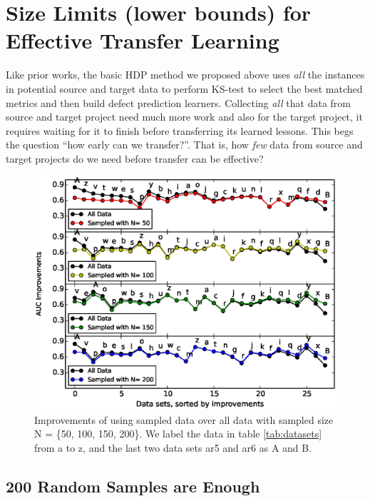 
\section{Size Limits (lower bounds) for Effective Transfer Learning}
\label{sec:sizelimit}

Like prior works\cite{nam2013transfer,
  ma2012transfer, rahman2012recalling, ryu2014value,
  zhang2014towards}, the basic HDP method we
proposed above uses {\em all} the instances in potential source and target data to
perform KS-test to select the best matched metrics and then build
defect prediction learners.
Collecting {\em all} that data from source and target project need much more work and also
for the target project, it requires waiting for it to finish before
transferring its learned lessons. This begs the question ``how early can we transfer?''.
That is, how {\em few} data from source and target projects do we need before transfer can be effective?

\begin{figure}[!htp]
	\centering
	\includegraphics[width=\linewidth]{Figures/raleigh/sample_random.eps}
	\caption{Improvements of using sampled data over all data with sampled size N = \{50, 100, 150, 200\}. We label the data in table \ref{tab:datasets} from a to z, and the last two data sets ar5 and ar6 as A and B.}
	\label{fig:small_data}
\end{figure}


\subsection{200 Random Samples are Enough}

